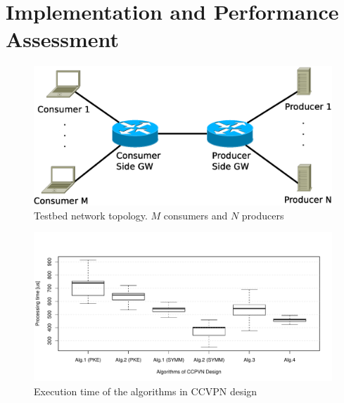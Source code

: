 \section{Implementation and Performance Assessment}\label{sec:exp}

\begin{figure}[]
\centering
\includegraphics[width=\columnwidth]{images/testnet.eps}
\caption{Testbed network topology. $M$ consumers and $N$ producers}\label{testnet}
\end{figure}

\begin{figure}[]
\centering
\includegraphics[width=\columnwidth]{images/times.pdf}
\caption{Execution time of the algorithms in CCVPN design}\label{times}
\end{figure}

